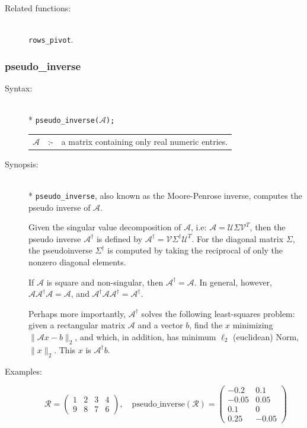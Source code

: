 {\begin{description}
\item[Related functions:]\mbox{}\\
\texttt{rows\_pivot}.
\end{description}


\subsubsection{pseudo\_inverse}
\label{linalg:pseudo_inverse}
\hypertarget{operator:PSEUDO_INVERSE}{}

\begin{description}
\item[Syntax:]\mbox{}\\*
{\tt pseudo\_inverse($\mathcal{A}$);}\\[2mm]
\begin{tabular}{l l l}
$\mathcal{A}$ &:-& a matrix containing only real numeric entries.
\end{tabular}

\item[Synopsis:]\mbox{}\\*
\texttt{pseudo\_inverse}, also known as the Moore-Penrose inverse, computes
the pseudo inverse of $\mathcal{A}$.

Given the singular value decomposition of $\mathcal{A}$, i.e: $\mathcal{A} =
\mathcal{U}
\Sigma\mathcal{V}^T$, then the pseudo inverse $\mathcal{A}^{\dagger}$ is defined
by $\mathcal{A}^{\dagger} = \mathcal{V} \Sigma^{\dagger} \mathcal{U}^{T}$. For the
diagonal
matrix $\Sigma$, the pseudoinverse $\Sigma^{\dagger}$ is computed by taking the reciprocal
of only the nonzero diagonal elements.

If $\mathcal{A}$ is square and non-singular, then $\mathcal{A}^{\dagger} = \mathcal{A}$.
In general, however,
$\mathcal{A} \mathcal{A}^{\dagger} \mathcal{A} = \mathcal{A}$, and
$\mathcal{A}^{\dagger} \mathcal{A} \mathcal{A}^{\dagger} = \mathcal{A}^{\dagger}$.

Perhaps more importantly, $\mathcal{A}^{\dagger}$ solves the following least-squares
problem: given a rectangular matrix $\mathcal{A}$ and a vector $b$, find the
$x$ minimizing $\|\mathcal{A}x - b\|_2$,
and which, in addition, has minimum $\ell_{2}$ (euclidean) Norm, $\|x\|_2$.
This $x$ is $\mathcal{A}^{\dagger} b$.

\item[Examples:]
\begin{flushleft}
\[
\mathcal{R} = \begin{pmatrix} 1 & 2 & 3 & 4 \\ 9 & 8 & 7 & 6 \end{pmatrix},
\quad
\text{pseudo}\_\text{inverse}(\mathcal{R}) =
        \begin{pmatrix} -0.2 & 0.1 \\ -0.05 & 0.05 \\ 0.1 & 0 \\ 0.25 & -0.05 \end{pmatrix}
\]
\end{flushleft}


\end{description}}

